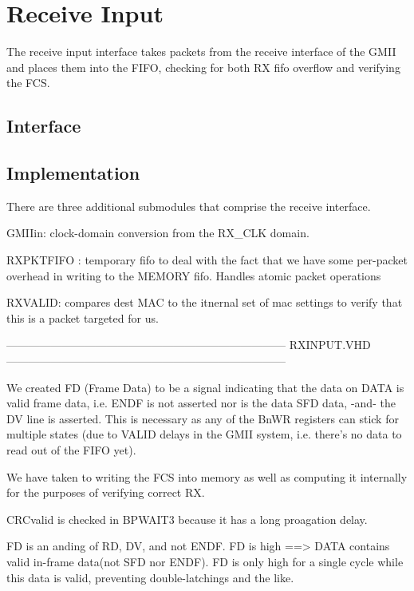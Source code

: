 \section{Receive Input}

The receive input interface takes packets from the receive interface of the GMII and places them into the FIFO, checking for both RX fifo overflow and verifying the FCS. 

\subsection{Interface}

\subsection{Implementation}

There are three additional submodules that comprise the receive interface. 

GMIIin: clock-domain conversion from the RX_CLK domain.

RXPKTFIFO : temporary fifo to deal with the fact that we have some
per-packet overhead in writing to the MEMORY fifo. Handles atomic
packet operations

RXVALID: compares dest MAC to the itnernal set of mac settings to
verify that this is a packet targeted for us.



---------------------------------------------------------------------------
RXINPUT.VHD
---------------------------------------------------------------------------

We created FD (Frame Data) to be a signal indicating that the data on DATA is valid frame data, i.e. ENDF is not asserted nor is the data SFD data, -and- the DV line is asserted. This is necessary as any of the BnWR registers can stick for multiple states (due to VALID delays in the GMII system, i.e. there's no data to read out of the FIFO yet). 

We have taken to writing the FCS into memory as well as computing it
internally for the purposes of verifying correct RX. 

CRCvalid is checked in BPWAIT3 because it has a long proagation delay. 

FD is an anding of RD, DV, and not ENDF. FD is high ==> DATA contains valid in-frame data(not SFD nor ENDF). FD is only high for a single cycle while this data is valid, preventing double-latchings and the like. 

